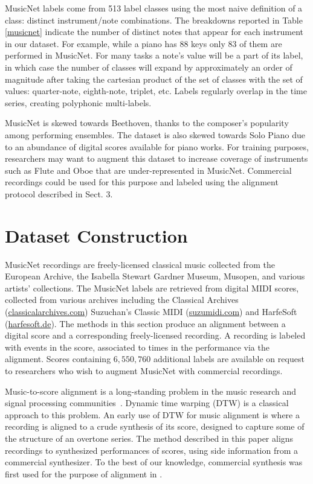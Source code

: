 \documentclass{article} \usepackage{iclr2017_conference,times}
\begin{document}
\fi

MusicNet labels come from 513 label classes using the most naive definition of a class: distinct instrument/note combinations.  The breakdowns reported in Table \ref{musicnet} indicate the number of distinct notes that appear for each instrument in our dataset. For example, while a piano has 88 keys only 83 of them are performed in MusicNet.  For many tasks a note's value will be a part of its label, in which case the number of classes will expand by approximately an order of magnitude after taking the cartesian product of the set of classes with the set of values: quarter-note, eighth-note, triplet, etc. Labels regularly overlap in the time series, creating polyphonic multi-labels.

MusicNet is skewed towards Beethoven, thanks to the composer's popularity among performing ensembles. The dataset is also skewed towards Solo Piano due to an abundance of digital scores available for piano works. For training purposes, researchers may want to augment this dataset to increase coverage of instruments such as Flute and Oboe that are under-represented in MusicNet. Commercial recordings could be used for this purpose and labeled using the alignment protocol described in Sect. 3.



 \section{Dataset Construction}

MusicNet recordings are freely-licensed classical music collected from the European Archive, the Isabella Stewart Gardner Museum, Musopen, and various artists' collections. The MusicNet labels are retrieved from digital MIDI scores, collected from various archives including the Classical Archives (\url{classicalarchives.com}) Suzuchan's Classic MIDI (\url{suzumidi.com}) and HarfeSoft (\url{harfesoft.de}). The methods in this section produce an alignment between a digital score and a corresponding freely-licensed recording. A recording is labeled with events in the score, associated to times in the performance via the alignment. Scores containing $6,550,760$ additional labels are available on request to researchers who wish to augment MusicNet with commercial recordings.

Music-to-score alignment is a long-standing problem in the music research and signal processing communities~\citep{raphael99}. Dynamic time warping (DTW) is a classical approach to this problem. An early use of DTW for music alignment is \cite{orio} where a recording is aligned to a crude synthesis of its score, designed to capture some of the structure of an overtone series. The method described in this paper aligns recordings to synthesized performances of scores, using side information from a commercial synthesizer. To the best of our knowledge, commercial synthesis was first used for the purpose of alignment in \cite{turetsky}.
\end{document}
